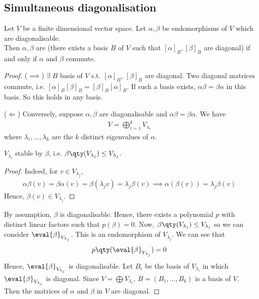 \subsection{Simultaneous diagonalisation}
\begin{theorem}
	Let $V$ be a finite dimensional vector space.
	Let $\alpha, \beta$ be endomorphisms of $V$ which are diagonalisable. \\
	Then $\alpha, \beta$ are  (there exists a basis $B$ of $V$ such that $[\alpha]_B, [\beta]_B$ are diagonal) if and only if $\alpha$ and $\beta$ commute.
\end{theorem}

\begin{proof}
	($\implies$) $\exists \; B$ basis of $V$ s.t. $[\alpha]_B$, $[\beta]_B$ are diagonal.
	Two diagonal matrices commute, i.e. $[\alpha]_B [\beta]_B = [\beta]_B [\alpha]_B$.
	If such a basis exists, $\alpha \beta = \beta \alpha$ in this basis.
	So this holds in any basis.

	($\Longleftarrow$)
	Conversely, suppose $\alpha, \beta$ are diagonalisable and $\alpha \beta = \beta \alpha$.
	We have
	\begin{align*}
		V = \bigoplus_{i=1}^k V_{\lambda_i}
	\end{align*}
	where $\lambda_i, \dots, \lambda_k$ are the $k$ distinct eigenvalues of $\alpha$.
	\begin{claim}
		$V_{\lambda_i}$ stable by $\beta$, i.e. $\beta \qty(V_{\lambda_j}) \leq V_{\lambda_j}$.
	\end{claim} 
	\begin{proof}
		Indeed, for $v \in V_{\lambda_j}$,
		\begin{align*}
			\alpha \beta(v) = \beta \alpha(v) = \beta(\lambda_j v) = \lambda_j \beta(v) \implies \alpha(\beta(v)) = \lambda_j \beta(v)
		\end{align*}
		Hence, $\beta(v) \in V_{\lambda_j}$.
	\end{proof} 
	By assumption, $\beta$ is diagonalisable.
	Hence, there exists a polynomial $p$ with distinct linear factors such that $p(\beta) = 0$.
	Now, $\beta\qty(V_{\lambda_j}) \leq V_{\lambda_j}$ so we can consider $\eval{\beta}_{V_{\lambda_j}}$.
	This is an endomorphism of $V_{\lambda_j}$.
	We can see that
	\begin{align*}
		p\qty(\eval{\beta}_{V_{\lambda_j}}) = 0
	\end{align*}
	Hence, $\eval{\beta}_{V_{\lambda_j}}$ is diagonalisable.
	Let $B_i$ be the basis of $V_{\lambda_i}$ in which $\eval{\beta}_{V_{\lambda_j}}$ is diagonal.
	Since $V = \bigoplus V_{\lambda_i}$, $B = (B_1, \dots, B_k)$ is a basis of $V$.
	Then the matrices of $\alpha$ and $\beta$ in $V$ are diagonal.
\end{proof}

